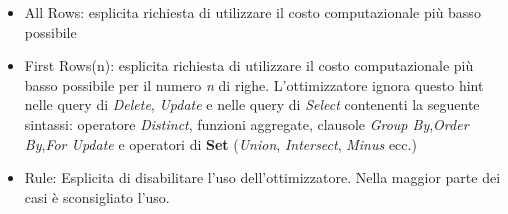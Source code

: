 \begin{itemize}
\item All Rows: esplicita richiesta di utilizzare il costo computazionale più basso possibile
\item First Rows(n): esplicita richiesta di utilizzare il costo computazionale più basso possibile per il numero \textit{n} di righe. L'ottimizzatore ignora questo hint nelle query di \textit{Delete}, \textit{Update} e nelle query di \textit{Select} contenenti la seguente sintassi: operatore \textit{Distinct}, funzioni aggregate, clausole \textit{Group By},\textit{Order By},\textit{For Update} e operatori  di \textbf{Set} (\textit{Union}, \textit{Intersect}, \textit{Minus} ecc.)
\item Rule: Esplicita di disabilitare l'uso dell'ottimizzatore. Nella maggior parte dei casi è sconsigliato l'uso.
\end{itemize}
